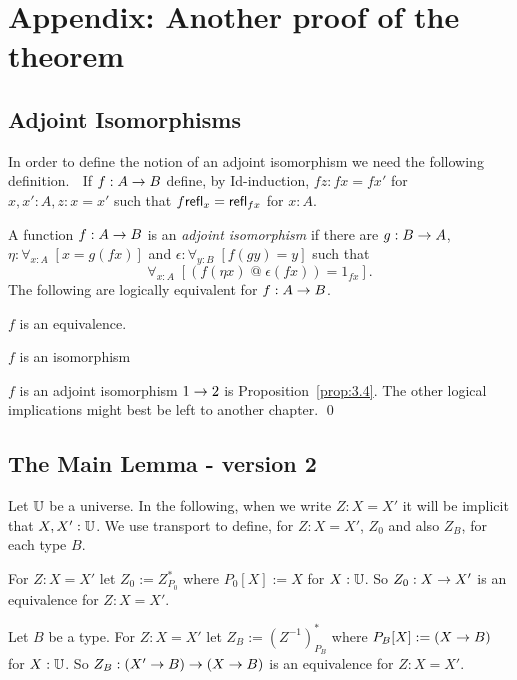 
\section{Appendix: Another proof of the theorem}


\subsection{Adjoint  Isomorphisms}

In order to define the notion of an adjoint isomorphism we need the following definition.
 $\;$
If $f:A\rightarrow B$ define, by Id-induction, $fz:fx=fx'$ for $x,x':A, z:x=x'$ such that $f\mathsf{refl}_{x} = \mathsf{refl}_{fx}$ for $x:A$.

 A function $f:A\rightarrow B$ is an {\em adjoint isomorphism} if there are $g:B\rightarrow A$, $\eta:\forall_{x:A}\; [x=g(fx)]$ and $\epsilon:\forall_{y:B}\; [f(gy)=y]$ such that 
  \[\forall_{x:A}\;[(f(\eta x)\; @\;\epsilon(fx))=1_{fx}].\]
\label{prop:6.3} The following are logically equivalent for $f:A\rightarrow B$.
\item $f$ is an equivalence.
\item $f$ is an isomorphism
\item $f$ is an adjoint isomorphism
\proof $1\rightarrow 2$ is Proposition~\ref{prop:3.4}.  The other logical implications might best be left to another chapter.
\qed

\subsection{The Main Lemma - version 2}
 Let $\mathbb{U}$ be a universe.  In the following, when we write $Z:X=X'$ it will be implicit that $X,X':\mathbb{U}$.  We use transport to define,  for $Z:X=X'$, $Z_0$ and also $Z_B$, for each type $B$. 
 $\;$\label{def:6.4}
\item For $Z:X=X'$ let $Z_0:= Z^*_{P_0}$ where $P_0[X]:=X$ for $X:\mathbb{U}$.  
So $Z_0:X\rightarrow X'$ is an equivalence for  $Z:X=X'$.
\item Let $B$ be a type.  For $Z:X=X'$ let $Z_B:=(Z^{-1})^*_{P_B}$ where
$P_B[X]:=(X\rightarrow B)$ for $X:\mathbb{U}$.  So $Z_B: (X'\rightarrow B)\rightarrow(X\rightarrow B)$ is an equivalence for $Z:X=X'$.

